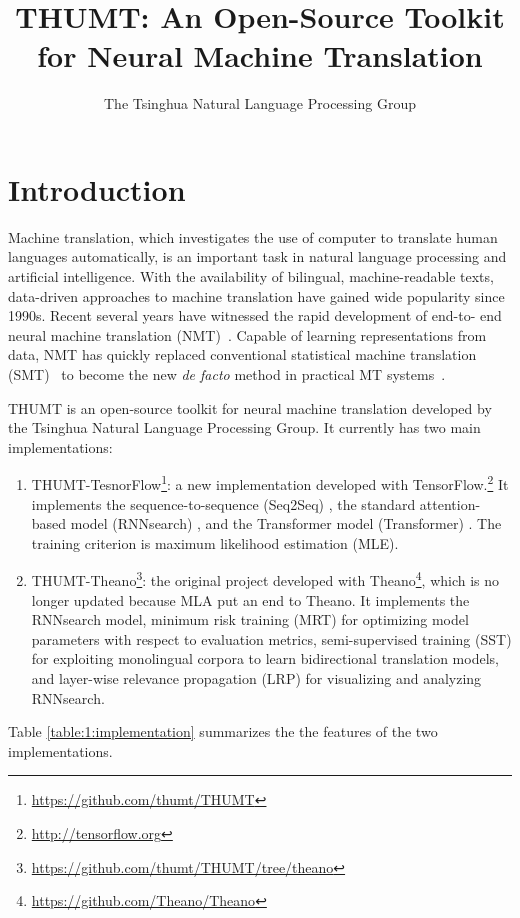 \documentclass{article}
\title{THUMT: An Open-Source Toolkit for Neural Machine Translation}
\author{The Tsinghua Natural Language Processing Group}
\begin{document}
\maketitle

\section{Introduction}
Machine translation, which investigates the use of computer to translate human languages automatically, is an important task in natural language processing and artificial intelligence. With the availability of bilingual, machine-readable texts, data-driven approaches to machine translation have gained wide popularity since 1990s. Recent several years have witnessed the rapid development of end-to- end neural machine translation (NMT)~\citep{Sutskever:14,Bahdanau:15,Vaswani:17}. Capable of learning representations from data, NMT has quickly replaced conventional statistical machine translation (SMT)~\citep{Brown:93,Koehn:03,Chiang:05} to become the new {\em de facto} method in practical MT systems~\citep{Wu:16}.

THUMT is an open-source toolkit for neural machine translation developed by the Tsinghua Natural Language Processing Group. It currently has two main implementations:

\begin{enumerate}
\item THUMT-TesnorFlow\footnote{\href{https://github.com/thumt/THUMT}{https://github.com/thumt/THUMT}}: a new implementation developed with TensorFlow.\footnote{\href{http://tensorflow.org}{http://tensorflow.org}} It implements the sequence-to-sequence (Seq2Seq) \citep{Sutskever:14}, the standard attention-based model (RNNsearch) \citep{Bahdanau:15}, and the Transformer model (Transformer) \citep{Vaswani:17}. The training criterion is maximum likelihood estimation (MLE).
\item THUMT-Theano\footnote{\href{https://github.com/thumt/THUMT/tree/theano}{https://github.com/thumt/THUMT/tree/theano}}: the original project developed with Theano\footnote{\href{https://github.com/Theano/Theano}{https://github.com/Theano/Theano}}, which is no longer updated because MLA put an end to Theano. It implements the RNNsearch model, minimum risk training (MRT) \citep{Shen:16} for optimizing model parameters with respect to evaluation metrics, semi-supervised training (SST) \citep{Cheng:16} for exploiting monolingual corpora to learn bidirectional translation models, and layer-wise relevance propagation (LRP) \citep{Ding:17} for visualizing and analyzing RNNsearch.
\end{enumerate}
Table \ref{table:1:implementation} summarizes the the features of the two implementations.
\end{document}
